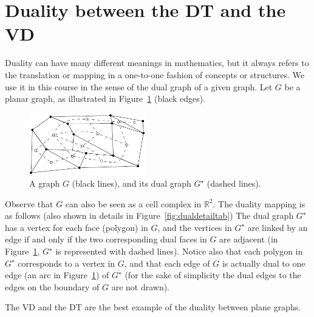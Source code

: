 %
\section{Duality between the DT and the VD}
\label{sec:duality}

Duality can have many different meanings in mathematics, but it always refers to the translation or mapping in a one-to-one fashion of concepts or structures. 
We use it in this course in the sense of the dual graph of a given graph. 
Let $G$ be a planar graph, as illustrated in Figure~\ref{fig:dual_graph} (black edges).
\begin{figure}
  \centering
  \includegraphics[width=0.45\textwidth]{figs/dual_graph}
  \caption{A graph $G$ (black lines), and its dual graph $G^\star$ (dashed lines).}
\label{fig:dual_graph}
\end{figure}
Observe that $G$ can also be seen as a cell complex in $\mathbb{R}^{2}$. 
The duality mapping is as follows (also shown in details in Figure~\ref{fig:dualdetailtab})
The dual graph $G^{\star}$ has a vertex for each face (polygon) in $G$, and the vertices in $G^{\star}$ are linked by an edge if and only if the two corresponding dual faces in $G$ are adjacent (in Figure~\ref{fig:dual_graph}, $G^{\star}$ is represented with dashed lines). 
Notice also that each polygon in $G^{\star}$ corresponds to a vertex in $G$, and that each edge of $G$ is actually dual to one edge (an arc in Figure~\ref{fig:dual_graph}) of $G^{\star}$ (for the sake of simplicity the dual edges to the edges on the boundary of $G$ are not drawn).

The VD and the DT are the best example of the duality between plane graphs.

